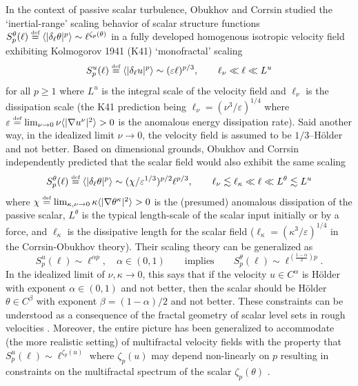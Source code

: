 \documentclass[12pt]{report}   %
\newcommand{\defeq}{\stackrel{\scriptscriptstyle\textup{def}}{=}}
\renewcommand{\ge}{\geqslant}
\numberwithin{equation}{section}
\theoremstyle{plain}
\theoremstyle{definition}
\theoremstyle{remark}
\newcommand{\ve}{\varepsilon}
\begin{document}
In the context of passive scalar turbulence, Obukhov \cite{Obukhov49} and Corrsin \cite{Corrsin51} studied the `inertial-range' scaling behavior of scalar structure functions $S_p^\theta (\ell)\defeq \langle |\delta_\ell \theta|^p\rangle\sim \ell^{\zeta_p(\theta)}$ 
in a fully developed homogenous isotropic velocity field exhibiting Kolmogorov 1941 (K41) `monofractal' scaling \cite{Kolmogorov41}
\begin{equation}
S_p^u(\ell)\defeq \langle |\delta_\ell u|^p\rangle \sim (\ve \ell)^{p/3}, \qquad \ell_\nu \ll \ell \ll L^u
\end{equation}
for all $p\ge 1$  where $L^u$ is the integral scale of the velocity field and $\ell_\nu$ is the dissipation scale (the K41 prediction being $\ell_\nu =(\nu^3/\varepsilon)^{1/4}$ where $\varepsilon\defeq \lim_{\nu \to 0} \nu\langle |\nabla u^\nu|^2\rangle >0$ is the anomalous energy dissipation rate).  Said another way, in the idealized limit $\nu \to 0$, the velocity field  is assumed to be $1/3$--H\"{o}lder and not better.
Based on dimensional grounds,  Obukhov and Corrsin  independently predicted that the scalar field would also exhibit the same scaling 
\begin{equation}
S_p^\theta (\ell)\defeq \langle |\delta_\ell \theta|^p\rangle \sim  (\chi/\varepsilon^{1/3})^{p/2} \ell^{p/3}, \qquad \ell_\nu \lesssim \ell_\kappa \ll \ell \ll L^\theta\lesssim L^u
\end{equation}
where $\chi\defeq \lim_{\kappa,\nu \to 0} \kappa\langle |\nabla \theta^\kappa|^2\rangle>0$ is the (presumed) anomalous dissipation of the passive scalar, $ L^\theta$ is the typical length-scale of the scalar input initially or by a force, and $\ell_\kappa$ is the dissipative length for the scalar field ($\ell_\kappa = (\kappa^3/\ve)^{1/4}$ in the Corrsin-Obukhov theory).  Their scaling theory can be generalized  as
\begin{equation}
S_p^u(\ell)\sim \ell^{\alpha p}, \quad \alpha \in (0,1) \qquad \text{implies} \qquad S_p^\theta(\ell)\sim \ell^{\left(\frac{1-\alpha}{2}\right) p}.
\end{equation}
In the idealized limit of $\nu, \kappa\to 0$, this says that if the velocity $u\in C^\alpha$ is H\"{o}lder with exponent $\alpha\in (0,1)$ and not better, then the scalar should be H\"{o}lder $\theta\in C^\beta$ with exponent $\beta= (1-\alpha)/2$ and not better. These constraints can be understood as a consequence of the fractal geometry of scalar level sets in rough velocities \cite{ConstantinProcaccia93,ConstantinProcaccia94}.  Moreover,  the entire picture has been generalized to accommodate (the more realistic setting) of multifractal velocity fields with the property that $S_p^u(\ell)\sim  \ell^{\zeta_p(u)}$ where $\zeta_p(u)$ may depend non-linearly on $p$ resulting in constraints on the multifractal spectrum of the scalar $\zeta_p(\theta)$ \cite{Eyink96}.
\end{document}
